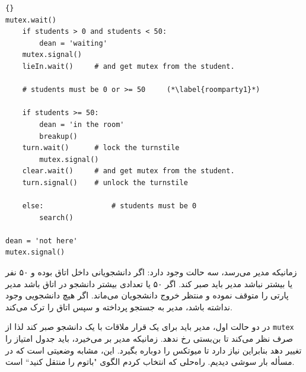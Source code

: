 \documentclass{book}
\begin{document}
\begin{latin}
\begin{lstlisting}[title=\rl{راه‌حل اتاق پارتی (مدیر)}]{}
mutex.wait()
    if students > 0 and students < 50:
        dean = 'waiting'
	mutex.signal()
	lieIn.wait()     # and get mutex from the student.

    # students must be 0 or >= 50     (*\label{roomparty1}*)

    if students >= 50:
        dean = 'in the room'
        breakup()
	turn.wait()      # lock the turnstile
        mutex.signal()
	clear.wait()     # and get mutex from the student.
	turn.signal()    # unlock the turnstile

    else:                # students must be 0
        search()

dean = 'not here'
mutex.signal() 
\end{lstlisting}
\end{latin}

    زمانیکه مدیر می‌رسد، سه حالت وجود دارد: 
    اگر دانشجویانی داخل اتاق بوده و ۵۰ نفر یا بیشتر  نباشد مدیر باید صبر کند. اگر ۵۰ یا تعدادی بیشتر دانشجو در اتاق باشد مدیر پارتی را متوقف نموده و 
    منتظر خروج دانشجویان می‌ماند. اگر هیچ دانشجویی وجود نداشته باشد، مدیر به جستجو پرداخته و سپس اتاق را ترک می‌کند. 
    

    در دو حالت اول، مدیر باید برای یک قرار ملاقات با یک دانشجو صبر کند لذا از {\tt mutex} صرف نظر می‌‌کند تا بن‌بستی رخ ندهد. 
    زمانیکه مدیر بر می‌خیرد، باید جدول امتیاز را تغییر دهد بنابراین نیاز دارد تا میوتکس را دوباره بگیرد. 
    این، مشابه وضعیتی است که در مسأله بار سوشی دیدیم. راه‌حلی که انتخاب کردم الگوی "باتوم را منتقل کنید`` است. 
\end{document}
